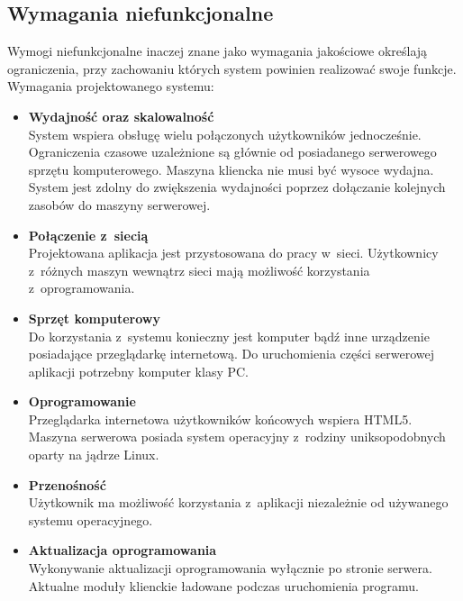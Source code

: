\documentclass[a4paper,12pt,oneside]{mwrep}  %
\begin{document}
\subsection{Wymagania niefunkcjonalne}
Wymogi niefunkcjonalne inaczej znane jako wymagania jakościowe określają ograniczenia, przy zachowaniu których system powinien realizować swoje funkcje. Wymagania projektowanego systemu:

\begin{itemize}
\item \textbf{Wydajność oraz skalowalność}\\
System wspiera obsługę wielu połączonych użytkowników jednocześnie.
Ograniczenia czasowe uzależnione są głównie od posiadanego serwerowego sprzętu komputerowego. Maszyna kliencka nie musi być wysoce wydajna. System jest zdolny do zwiększenia wydajności poprzez dołączanie kolejnych zasobów do maszyny serwerowej.\\

\item \textbf{Połączenie z~siecią}\\
Projektowana aplikacja jest przystosowana do pracy w~sieci. Użytkownicy z~różnych maszyn wewnątrz sieci mają możliwość korzystania z~oprogramowania.\\

\item \textbf{Sprzęt komputerowy}\\
Do korzystania z~systemu konieczny jest komputer bądź inne urządzenie posiadające przeglądarkę internetową. Do uruchomienia części serwerowej aplikacji potrzebny komputer klasy PC.\\

\item \textbf{Oprogramowanie}\\
Przeglądarka internetowa użytkowników końcowych wspiera HTML5. Maszyna serwerowa posiada system operacyjny z~rodziny uniksopodobnych oparty na jądrze Linux.\\

\item \textbf{Przenośność}\\
Użytkownik ma możliwość korzystania z~aplikacji niezależnie od używanego systemu operacyjnego.\\

\item \textbf{Aktualizacja oprogramowania}\\
Wykonywanie aktualizacji oprogramowania wyłącznie po stronie serwera. Aktualne moduły klienckie ładowane podczas uruchomienia programu.


\end{itemize}
\end{document}
